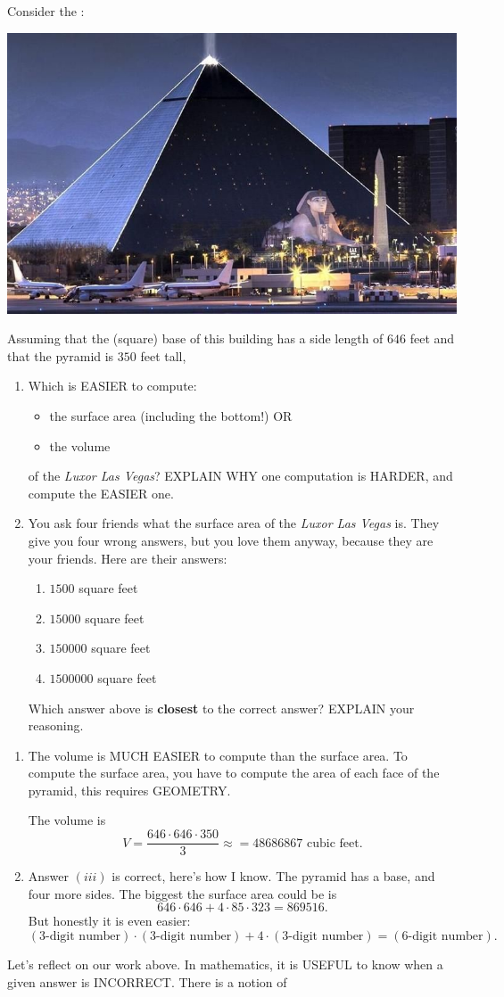 \documentclass[handout,nooutcomes,noauthor]{ximera}
\begin{document}
\begin{question}
  Consider the :
  \begin{center}
    \includegraphics[width=.4\textwidth]{pyramid.jpg} 
  \end{center}
 Assuming that the (square) base of this building has a side length of
 $646$ feet and that the pyramid is $350$ feet tall,
  \begin{enumerate}
  \item Which is EASIER to compute:
    \begin{itemize}
    \item the surface area (including the bottom!) OR
    \item the volume
    \end{itemize}
    of the \textit{Luxor Las Vegas}? EXPLAIN WHY one computation is
    HARDER, and compute the EASIER one.
  \item You ask four friends what the surface area of the
    \textit{Luxor Las Vegas} is. They give you four wrong answers, but
    you love them anyway, because they are your friends. Here are
    their answers:
    \begin{enumerate}
    \item $1500$ square feet
    \item $15000$ square feet
    \item $150000$ square feet
    \item $1500000$ square feet
    \end{enumerate}
    Which answer above is \textbf{closest} to the correct answer? EXPLAIN your reasoning.
  \end{enumerate}
  \begin{freeResponse}
    \begin{enumerate}
      \item The volume is MUCH EASIER to compute than the surface
        area. To compute the surface area, you have to compute the
        area of each face of the pyramid, this requires GEOMETRY.

        The volume is
        \[
        V = \frac{646\cdot 646\cdot 350}{3} \approx = 48686867 \text{ cubic feet}.
        \]
      \item Answer $(iii)$ is correct, here's how I know. The pyramid
        has a base, and four more sides. The biggest the surface area could be is
        \[
        646\cdot 646+ 4\cdot 85\cdot 323 = 869516.
        \]
        But honestly it is even easier:
        \[
        (\text{3-digit number}) \cdot (\text{3-digit number}) + 4\cdot
        (\text{3-digit number}) = (\text{6-digit number}).
        \]
    \end{enumerate}
  \end{freeResponse}
\end{question}
\mynewpage


\begin{question}
  Let's reflect on our work above.  In mathematics, it is USEFUL to
  know when a given answer is INCORRECT. There is a notion of 
\end{question}
\end{document}
